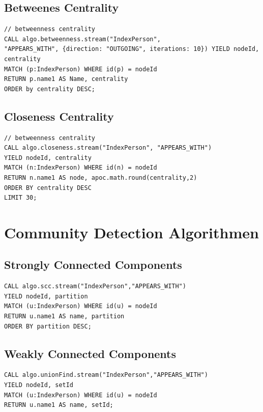 \documentclass[ngerman,]{scrreprt}
\begin{document}
\subsection{Betweenes Centrality}\label{betweenes-centrality}

\begin{verbatim}
// betweenness centrality
CALL algo.betweenness.stream("IndexPerson",
"APPEARS_WITH", {direction: "OUTGOING", iterations: 10}) YIELD nodeId, centrality
MATCH (p:IndexPerson) WHERE id(p) = nodeId
RETURN p.name1 AS Name, centrality
ORDER by centrality DESC;
\end{verbatim}

\subsection{Closeness Centrality}\label{closeness-centrality}

\begin{verbatim}
// betweenness centrality
CALL algo.closeness.stream("IndexPerson", "APPEARS_WITH")
YIELD nodeId, centrality
MATCH (n:IndexPerson) WHERE id(n) = nodeId
RETURN n.name1 AS node, apoc.math.round(centrality,2)
ORDER BY centrality DESC
LIMIT 30;
\end{verbatim}

\section{Community Detection Algorithmen}\label{community-detection-algorithmen}

\subsection{Strongly Connected Components}\label{strongly-connected-components}

\begin{verbatim}
CALL algo.scc.stream("IndexPerson","APPEARS_WITH")
YIELD nodeId, partition
MATCH (u:IndexPerson) WHERE id(u) = nodeId
RETURN u.name1 AS name, partition
ORDER BY partition DESC;
\end{verbatim}

\subsection{Weakly Connected Components}\label{weakly-connected-components}

\begin{verbatim}
CALL algo.unionFind.stream("IndexPerson","APPEARS_WITH")
YIELD nodeId, setId
MATCH (u:IndexPerson) WHERE id(u) = nodeId
RETURN u.name1 AS name, setId;
\end{verbatim}
\end{document}
